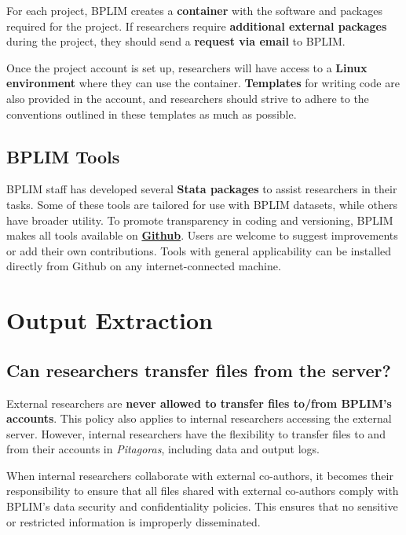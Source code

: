 \documentclass[
  a4paper,
  DIV=11,
  numbers=noendperiod]{scrartcl}
\begin{document}
For each project, BPLIM creates a \textbf{container} with the software
and packages required for the project. If researchers require
\textbf{additional external packages} during the project, they should
send a \textbf{request via email} to BPLIM.

Once the project account is set up, researchers will have access to a
\textbf{Linux environment} where they can use the container.
\textbf{Templates} for writing code are also provided in the account,
and researchers should strive to adhere to the conventions outlined in
these templates as much as possible.

\hypertarget{bplim-tools}{%
\subsection{BPLIM Tools}\label{bplim-tools}}

BPLIM staff has developed several \textbf{Stata packages} to assist
researchers in their tasks. Some of these tools are tailored for use
with BPLIM datasets, while others have broader utility. To promote
transparency in coding and versioning, BPLIM makes all tools available
on \href{https://github.com/BPLIM/Tools}{\textbf{Github}}. Users are
welcome to suggest improvements or add their own contributions. Tools
with general applicability can be installed directly from Github on any
internet-connected machine.

\hypertarget{output-extraction}{%
\section{Output Extraction}\label{output-extraction}}

\hypertarget{can-researchers-transfer-files-from-the-server}{%
\subsection{Can researchers transfer files from the
server?}\label{can-researchers-transfer-files-from-the-server}}

External researchers are \textbf{never allowed to transfer files to/from
BPLIM's accounts}. This policy also applies to internal researchers
accessing the external server. However, internal researchers have the
flexibility to transfer files to and from their accounts in
\emph{Pitagoras}, including data and output logs.

When internal researchers collaborate with external co-authors, it
becomes their responsibility to ensure that all files shared with
external co-authors comply with BPLIM's data security and
confidentiality policies. This ensures that no sensitive or restricted
information is improperly disseminated.
\end{document}
